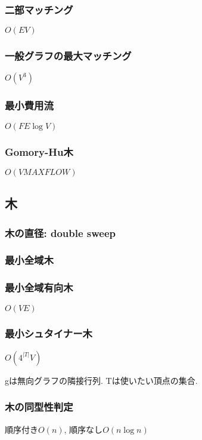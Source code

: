 \subsubsection{二部マッチング}
$O(EV)$\par



\subsubsection{一般グラフの最大マッチング}
$O(V^3)$\par


\subsubsection{最小費用流}
$O(FE\log V)$\par


\subsubsection{Gomory-Hu木}
$O(V MAXFLOW)$


\subsection{木}
\subsubsection{木の直径: double sweep}
\subsubsection{最小全域木}

\subsubsection{最小全域有向木}
$O(VE)$

\subsubsection{最小シュタイナー木}
$O(4^{|T|}V)$ \par
gは無向グラフの隣接行列. Tは使いたい頂点の集合.\par

\subsubsection{木の同型性判定}
順序付き$O(n)$, 順序なし$O(n\log n)$


